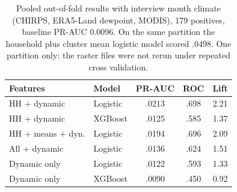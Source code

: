 \documentclass[11pt]{article}
\begin{document}
\begin{table}[t]
\centering\footnotesize\setlength{\tabcolsep}{3pt}
\begin{tabular}{llccc}
\toprule
Features & Model & PR-AUC & ROC & Lift\\
\midrule
HH + dynamic & Logistic & .0213 & .698 & 2.21\\
HH + dynamic & XGBoost & .0125 & .585 & 1.37\\
HH + means + dyn. & Logistic & .0194 & .696 & 2.09\\
All + dynamic & Logistic & .0136 & .624 & 1.51\\
Dynamic only & Logistic & .0122 & .593 & 1.33\\
Dynamic only & XGBoost & .0090 & .450 & 0.92\\
\bottomrule
\end{tabular}
\caption{Pooled out-of-fold results with interview month climate (CHIRPS, ERA5-Land dewpoint, MODIS), 179 positives, baseline PR-AUC 0.0096. On the same partition the household plus cluster mean logistic model scored .0498. One partition only: the raster files were not rerun under repeated cross validation.}
\label{tab:dyn}
\end{table}
\end{document}
